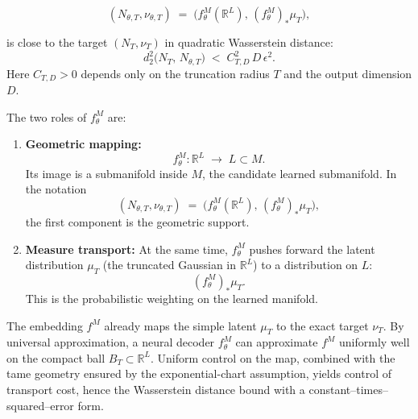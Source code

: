 \documentclass{article}
\begin{document}
\[
    (N_{\theta,T}, \nu_{\theta,T}) \;=\;\bigl(f^M_\theta(\mathbb{R}^L),\, (f^M_\theta)_* \mu_T\bigr),
\]


is close to the target \((N_T,\nu_T)\) in quadratic Wasserstein distance:
\[
d_2^2\!\bigl(N_T,\,N_{\theta,T}\bigr)\;<\; C_{T,D}^2\,D\,\epsilon^{2}.
\]
Here \(C_{T,D}>0\) depends only on the truncation radius \(T\) and the output dimension \(D\).

The two roles of \(f^M_\theta\) are:

\begin{enumerate}
  \item \textbf{Geometric mapping:} 
  \[
    f^M_\theta:\mathbb{R}^L \;\longrightarrow\; L \subset M.
  \]
  Its image is a submanifold inside \(M\), the candidate learned submanifold. 
  In the notation
  \[
    (N_{\theta,T}, \nu_{\theta,T}) \;=\;\bigl(f^M_\theta(\mathbb{R}^L),\, (f^M_\theta)_* \mu_T\bigr),
  \]
  the first component is the geometric support.

  \item \textbf{Measure transport:} 
  At the same time, \(f^M_\theta\) pushes forward the latent distribution 
  \(\mu_T\) (the truncated Gaussian in \(\mathbb{R}^L\)) to a distribution on \(L\):
  \[
    (f^M_\theta)_* \mu_T.
  \]
  This is the probabilistic weighting on the learned manifold.
\end{enumerate}



The embedding \(f^M\) already maps the simple latent \(\mu_T\) to the exact target \(\nu_T\). By universal approximation, a neural decoder \(f^M_\theta\) can approximate \(f^M\) uniformly well on the compact ball \(B_T\subset\mathbb{R}^L\). Uniform control on the map, combined with the tame geometry ensured by the exponential-chart assumption, yields control of transport cost, hence the  Wasserstein distance bound with a constant–times–squared–error form.
\end{document}
